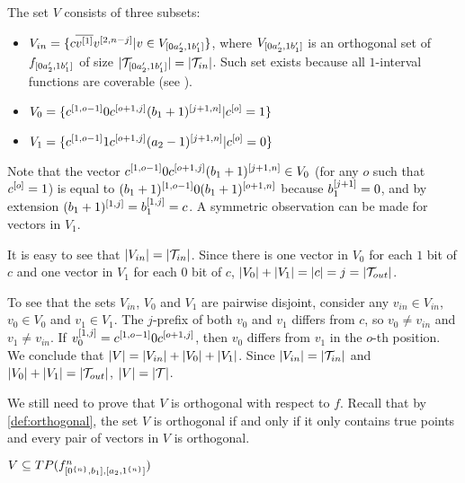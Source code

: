 The set $V$ consists of three subsets:
\begin{itemize}
\item $V_{in} = \{c \overline{v^{[1]}} v^{[2, n-j]}
| v \in V_{[0 a_2', 1 b_1']}\}$,
where $V_{[0 a_2', 1 b_1']}$ is an orthogonal set of $f_{[0 a_2', 1 b_1']}$
of size $\lvert\mathcal{T}_{[0 a_2', 1 b_1']}\rvert = \lvert\mathcal{T}_{in}\rvert$.
Such set exists because all $1$-interval functions
are coverable
(see ).

\item $V_0 =
\{c^{[1, o - 1]} 0 c^{[o + 1, j]} (b_1 + 1)^{[j+1, n]}
| c^{[o]} = 1\}$

\item $V_1 =
\{c^{[1, o - 1]} 1 c^{[o + 1, j]} (a_2 - 1)^{[j+1, n]}
| c^{[o]} = 0\}$
\end{itemize}

Note that the vector
$c^{[1, o - 1]} 0 c^{[o + 1, j]} (b_1 + 1)^{[j+1, n]} \in V_0$
(for any $o$ such that $c^{[o]} = 1$)
is equal to
$(b_1+1)^{[1, o - 1]} 0 (b_1+1)^{[o + 1, n]}$
because $b_1^{[j+1]} = 0$,
and by extension
$(b_1+1)^{[1, j]} = b_1^{[1, j]} = c$.
A symmetric observation can be made for vectors in $V_1$.

It is easy to see that
$\lvert V_{in}\rvert = \lvert\mathcal{T}_{in}\rvert$.
Since there is one vector in $V_0$
for each $1$ bit of $c$
and one vector in $V_1$
for each $0$ bit of $c$,
$\lvert V_0\rvert + \lvert V_1\rvert = \lvert c\rvert = j = \lvert\mathcal{T}_{out}\rvert$.

To see that the sets $V_{in}$, $V_0$ and $V_1$ are pairwise disjoint,
consider any $v_{in} \in V_{in}$, $v_0 \in V_0$ and $v_1 \in V_1$.
The $j$-prefix of both $v_0$ and $v_1$ differs from $c$,
so $v_0 \neq v_{in}$ and $v_1 \neq v_{in}$.
If $v_0^{[1, j]} = c^{[1, o-1]} 0 c^{[o+1, j]}$,
then $v_0$ differs from $v_1$ in the $o$-th position.
We conclude that $\lvert V\rvert = \lvert V_{in}\rvert + \lvert V_0\rvert + \lvert V_1\rvert$.
Since $\lvert V_{in}\rvert = \lvert\mathcal{T}_{in}\rvert$
and $\lvert V_0\rvert + \lvert V_1\rvert = \lvert\mathcal{T}_{out}\rvert$,
$\lvert V\rvert = \lvert\mathcal{T}\rvert$.

We still need to prove that $V$ is orthogonal
with respect to $f$.
Recall that by \cref{def:orthogonal},
the set $V$ is orthogonal
if and only if
it only contains true points
and every pair of vectors in $V$ is orthogonal.

\begin{lemma}
$V \subseteq TP(f^{n}_{[0^{\{n\}}, b_1], [a_2, 1^{\{n\}}]})$
\end{lemma}

